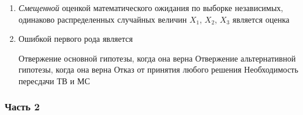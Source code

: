 \documentclass[12pt, a4paper]{article}\usepackage[]{graphicx}\usepackage[]{color}
\begin{document}
\begin{enumerate}
					 \\

					\item \emph{Смещенной} оценкой математического ожидания по выборке независимых, одинаково распределенных случайных величин $X_1$, $X_2$, $X_3$ является оценка


					\item Ошибкой первого рода является

					{Отвержение основной гипотезы, когда она верна}
					{Отвержение альтернативной гипотезы, когда она верна}
					{Отказ от принятия любого решения}
					{Необходимость пересдачи ТВ и МС}




				\end{enumerate}

				\subsubsection*{Часть 2}
\end{document}

